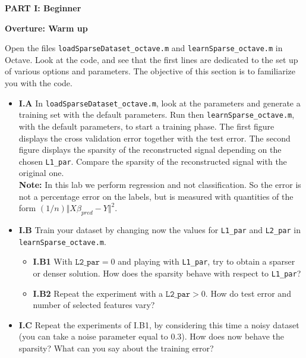 \documentclass[DIN, pagenumber=false, fontsize=11pt, parskip=half]{scrartcl}
\newcommand{\mysection}[1]{\noindent\large\textbf{#1}}
\begin{document}
\newpage
\begin{center}
\large\textbf{PART I: Beginner}
\end{center}

\mysection{Overture: Warm up}

\noindent Open the files \texttt{loadSparseDataset\_octave.m} and \texttt{learnSparse\_octave.m} in Octave.
Look at the code, and see that the first lines are dedicated to the set up of various options and parameters.
The objective of this section is to familiarize you with the code.

\begin{itemize}
	\item \textbf{I.A} In \texttt{loadSparseDataset\_octave.m}, look at the parameters and generate a training set with the default parameters.
	Run then \texttt{learnSparse\_octave.m}, with the default parameters, to start a training phase.
	The first figure displays the cross validation error together with the test error.
	The second figure displays the sparsity of the reconstructed signal depending on the chosen \texttt{L1\_par}.
	Compare the sparsity of the reconstructed signal with the original one.\\
	\textbf{Note:} In this lab we perform regression and not classification. So the error is not a percentage error on the labels,  but is measured with quantities of the form $(1/n)\Vert X \beta_{pred} - Y \Vert^2$. 
	
	\item \textbf{I.B} Train your dataset by changing now the values for \texttt{L1\_par} and \texttt{L2\_par} in \texttt{learnSparse\_octave.m}.
	\begin{itemize}
		\item \textbf{I.B1} With $\texttt{L2\_par}=0$ and playing with \texttt{L1\_par}, try to obtain a sparser or denser solution. How does the sparsity behave with respect to \texttt{L1\_par}?
		\item \textbf{I.B2} Repeat the experiment with a $\texttt{L2\_par}>0$. How do test error and number of selected features vary?
\end{itemize}		
	
	\item \textbf{I.C} Repeat the experiments of I.B1, by considering this time a noisy dataset (you can take a noise parameter equal to 0.3).
	How does now behave the sparsity? 
	What can you say about the training error?
	
\end{itemize}
\end{document}
